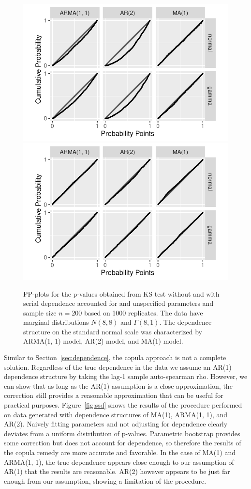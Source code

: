 \documentclass[12pt, letterpaper, titlepage]{article}
\begin{document}
\begin{figure}[tbp]
  \centering
  \includegraphics[width=.75\textwidth]{pp_s_f.pdf}
  \includegraphics[width=.75\textwidth]{pp_ssf.pdf}
  \caption{PP-plots for the p-values obtained from KS test without and with
    serial dependence accounted for and unspecified parameters and sample size
    $n = 200$ based on
    1000 replicates. The data have marginal distributions $N(8, 8)$ and
    $\Gamma(8, 1)$. The dependence structure on the standard normal scale was
    characterized by ARMA(1, 1) model, AR(2) model, and MA(1) model.
  }
  \label{fig:pp_ssf}
\end{figure}

Similar to Section~\ref{sec:dependence}, the copula approach is not a complete
solution. Regardless of the true dependence in the data we assume an AR(1)
dependence structure by taking the lag-1 sample auto-spearman rho. However, we
can show that as long as the AR(1) assumption is a close approximation, the
correction still provides a reasonable approximation that can be useful for
practical purposes. Figure~\ref{fig:ssd} shows the results of the
procedure performed on data generated with dependence structures of  MA(1),
ARMA(1, 1), and AR(2). Naively fitting parameters and not adjusting for
dependence clearly deviates from a uniform distribution of p-values. Parametric
bootstrap provides some correction but does not account for dependence, so
therefore the results of the copula remedy are more accurate and favorable.
In the case of MA(1) and ARMA(1, 1), the true dependence appears close enough
to our assumption of AR(1) that the results are reasonable. AR(2) however
appears to be just far enough from our assumption, showing a limitation of the
procedure.
\end{document}

